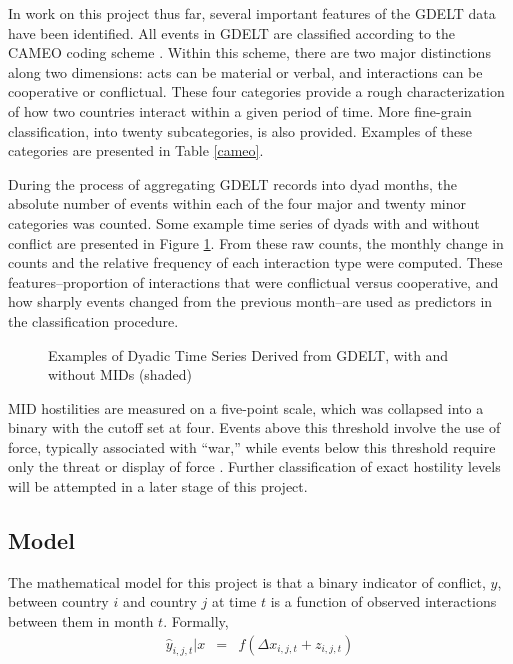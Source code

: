 \documentclass[12pt,letterpaper]{article} %
\begin{document}
In work on this project thus far, several important features of the GDELT data have been identified. All events in GDELT are classified according to the CAMEO coding scheme \citep{gerner:etal:2002}. Within this scheme, there are two major distinctions along two dimensions: acts can be material or verbal, and interactions can be cooperative or conflictual. These four categories provide a rough characterization of how two countries interact within a given period of time. More fine-grain classification, into twenty subcategories, is also provided. Examples of these categories are presented in Table \ref{cameo}.


During the process of aggregating GDELT records into dyad months, the absolute number of events within each of the four major and twenty minor categories was counted. Some example time series of dyads with and without conflict are presented in Figure \ref{timelines}.  From these raw counts, the monthly change in counts and the relative frequency of each interaction type were computed. These features--proportion of interactions that were conflictual versus cooperative, and how sharply events changed from the previous month--are used as predictors in the classification procedure.

\begin{figure}
   \begin{center}
    
    \caption{Examples of Dyadic Time Series Derived from GDELT, with and without MIDs (shaded)}
    \label{timelines}
  \end{center}
\end{figure} 

MID hostilities are measured on a five-point scale, which was collapsed into a binary with the cutoff set at four. Events above this threshold involve the use of force, typically associated with ``war,'' while events below this threshold require only the threat or display of force \citep{ghosn2004mid3}. Further classification of exact hostility levels will be attempted in a later stage of this project. 

\subsection{Model}

The mathematical model for this project is that a binary indicator of conflict, $y$, between country $i$ and country $j$ at time $t$ is a function of observed interactions between them in month $t$. Formally, 
\begin{eqnarray*}
\hat{y}_{i,j,t}|x &=& f(\Delta x_{i,j,t} + z_{i,j,t})
\end{eqnarray*}
\end{document}
